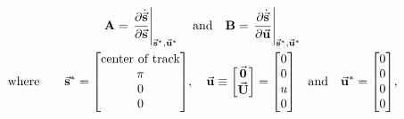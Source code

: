 \documentclass[
    crop,
    margin=0.05in,
    convert={density=150}
]{standalone}
\begin{document}
    $\displaystyle
        \begin{gathered}
            \vb{A} = \eval{\pdv{\dot{\va{s}}}{\va{s}}}_{\va{s}^*, \va{u}^*} \qq{and} \vb{B} = \eval{\pdv{\dot{\va{s}}}{\va{u}}}_{\va{s}^*, \va{u}^*}\\
            \text{where} \qquad \va{s}^* = \mqty[\text{center of track} \\ \pi \\ 0 \\ 0] \qc \va{u} \equiv \mqty[\va{0} \\ \va{U}] = \mqty[0 \\ 0 \\ u \\ 0] \qq{and} \va{u}^* = \mqty[0 \\ 0 \\ 0 \\ 0],
        \end{gathered}
    $
\end{document}
